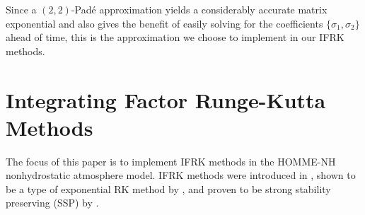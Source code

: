 \documentclass{csri19}
\begin{document}
Since a $(2,2)$-Pad\'e approximation yields a considerably accurate matrix 
exponential and also gives the benefit of easily solving for the 
coefficients $\{\sigma_1, \sigma_2\}$ ahead of time, this is the 
approximation we choose to implement in our IFRK methods.

\section{Integrating Factor Runge-Kutta Methods}\label{CFK:sec:ifrk}
The focus of this paper is to implement IFRK methods in the HOMME-NH 
nonhydrostatic atmosphere model. IFRK methods were introduced in 
\cite{CFK:Lawson1969}, shown to be a type of exponential RK method by
\cite{CFK:Minchev2006}, and proven to be strong stability preserving (SSP) 
by \cite{CFK:Isherwood2018}.
\end{document}
